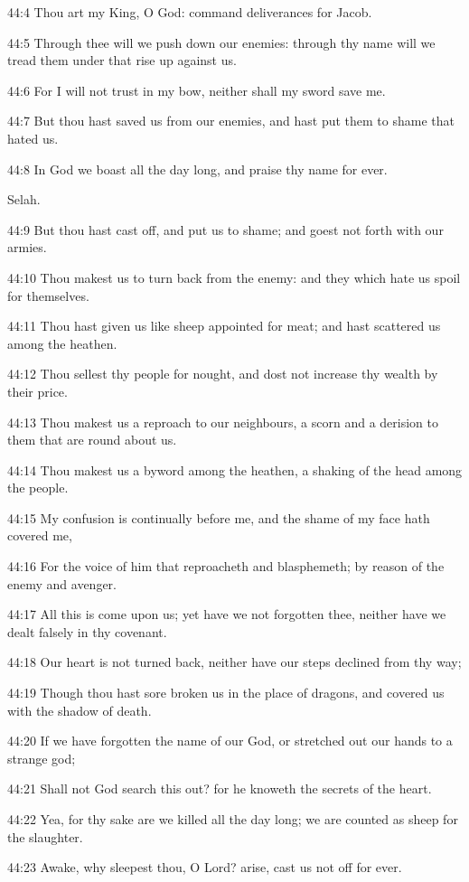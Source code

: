 44:4 Thou art my King, O God: command deliverances for Jacob.

44:5 Through thee will we push down our enemies: through thy name will we tread them under that rise up against us.

44:6 For I will not trust in my bow, neither shall my sword save me.

44:7 But thou hast saved us from our enemies, and hast put them to shame that hated us.

44:8 In God we boast all the day long, and praise thy name for ever.

Selah.

44:9 But thou hast cast off, and put us to shame; and goest not forth with our armies.

44:10 Thou makest us to turn back from the enemy: and they which hate us spoil for themselves.

44:11 Thou hast given us like sheep appointed for meat; and hast scattered us among the heathen.

44:12 Thou sellest thy people for nought, and dost not increase thy wealth by their price.

44:13 Thou makest us a reproach to our neighbours, a scorn and a derision to them that are round about us.

44:14 Thou makest us a byword among the heathen, a shaking of the head among the people.

44:15 My confusion is continually before me, and the shame of my face hath covered me,

44:16 For the voice of him that reproacheth and blasphemeth; by reason of the enemy and avenger.

44:17 All this is come upon us; yet have we not forgotten thee, neither have we dealt falsely in thy covenant.

44:18 Our heart is not turned back, neither have our steps declined from thy way;

44:19 Though thou hast sore broken us in the place of dragons, and covered us with the shadow of death.

44:20 If we have forgotten the name of our God, or stretched out our hands to a strange god;

44:21 Shall not God search this out? for he knoweth the secrets of the heart.

44:22 Yea, for thy sake are we killed all the day long; we are counted as sheep for the slaughter.

44:23 Awake, why sleepest thou, O Lord? arise, cast us not off for ever.

